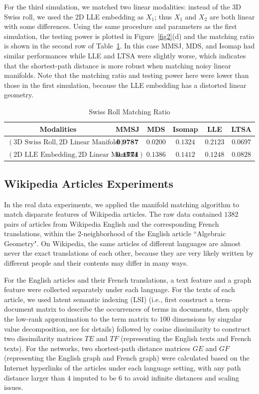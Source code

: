\documentclass[times,twocolumn,final]{elsarticle}
\begin{document}
For the third simulation, we matched two linear modalities: instead of the 3D Swiss roll, we used the 2D LLE embedding as $X_{1}$; thus $X_{1}$ and $X_{2}$ are both linear with some differences. Using the same procedure and parameters as the first simulation, the testing power is plotted in Figure~\ref{fig2}(d) and the matching ratio is shown in the second row of Table~\ref{table:Swiss}. In this case MMSJ, MDS, and Isomap had similar performances while LLE and LTSA were slightly worse, which indicates that the shortest-path distance is more robust when matching noisy linear manifolds. Note that the matching ratio and testing power here were lower than those in the first simulation, because the LLE embedding has a distorted linear geometry. 

\begin{table}[htbp]
\centering
\caption{Swiss Roll Matching Ratio}
\label{table:Swiss}
\begin{tabular}{|c||c|c|c|c|c|}
\hline
Modalities & MMSJ & MDS & Isomap & LLE & LTSA \\
\hline
$(\mbox{3D Swiss Roll}, \mbox{2D Linear Manifold})$ & $\textbf{0.9787}$  & $0.0200$ & $0.1324$ & $0.2123$ & $0.0697$\\
\hline
$(\mbox{2D LLE Embedding}, \mbox{2D Linear Manifold})$ & $\textbf{0.1771}$  & $0.1386$ & $0.1412$ & $0.1248$ & $0.0828$\\
\hline
\end{tabular}
\end{table}

\subsection{Wikipedia Articles Experiments}
\label{wikiReal}
In the real data experiments, we applied the manifold matching algorithm to match disparate features of Wikipedia articles. The raw data contained $1382$ pairs of articles from Wikipedia English and the corresponding French translations, within the 2-neighborhood of the English article ``Algebraic Geometry". On Wikipedia, the same articles of different languages are almost never the exact translations of each other, because they are very likely written by different people and their contents may differ in many ways.

For the English articles and their French translations, a text feature and a graph feature were collected separately under each language. For the texts of each article, we used latent semantic indexing (LSI) (i.e., first construct a term-document matrix to describe the occurrences of terms in documents, then apply the low-rank approximation to the term matrix to $100$ dimensions by singular value decomposition, see \citep{DeerwesterDumais1990} for details) followed by cosine dissimilarity to construct two dissimilarity matrices $TE$ and $TF$ (representing the English texts and French texts). For the networks, two shortest-path distance matrices $GE$ and $GF$ (representing the English graph and French graph) were calculated based on the Internet hyperlinks of the articles under each language setting, with any path distance larger than $4$ imputed to be $6$ to avoid infinite distances and scaling issues.
\end{document}

